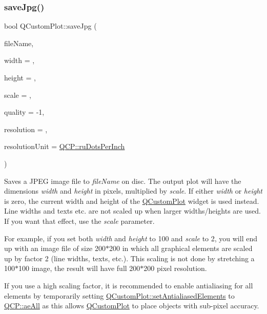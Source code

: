 \subsubsection{\texorpdfstring{saveJpg()}{saveJpg()}}
{\footnotesize\ttfamily bool Q\+Custom\+Plot\+::save\+Jpg (\begin{DoxyParamCaption}\item[{const Q\+String \&}]{file\+Name,  }\item[{int}]{width = {},  }\item[{int}]{height = {},  }\item[{double}]{scale = {},  }\item[{int}]{quality = {\ttfamily -\/1},  }\item[{int}]{resolution = {},  }\item[{\mbox{\hyperlink{namespace_q_c_p_a715d46153da230990aa887d0f0602452}{Q\+C\+P\+::\+Resolution\+Unit}}}]{resolution\+Unit = {\ttfamily \mbox{\hyperlink{namespace_q_c_p_a715d46153da230990aa887d0f0602452affb887d8efe79c39a1aca2acd7002afc}{Q\+C\+P\+::ru\+Dots\+Per\+Inch}}} }\end{DoxyParamCaption})}

Saves a J\+P\+EG image file to {\itshape file\+Name} on disc. The output plot will have the dimensions {\itshape width} and {\itshape height} in pixels, multiplied by {\itshape scale}. If either {\itshape width} or {\itshape height} is zero, the current width and height of the \mbox{\hyperlink{class_q_custom_plot}{Q\+Custom\+Plot}} widget is used instead. Line widths and texts etc. are not scaled up when larger widths/heights are used. If you want that effect, use the {\itshape scale} parameter.

For example, if you set both {\itshape width} and {\itshape height} to 100 and {\itshape scale} to 2, you will end up with an image file of size 200$\ast$200 in which all graphical elements are scaled up by factor 2 (line widths, texts, etc.). This scaling is not done by stretching a 100$\ast$100 image, the result will have full 200$\ast$200 pixel resolution.

If you use a high scaling factor, it is recommended to enable antialiasing for all elements by temporarily setting \mbox{\hyperlink{class_q_custom_plot_af6f91e5eab1be85f67c556e98c3745e8}{Q\+Custom\+Plot\+::set\+Antialiased\+Elements}} to \mbox{\hyperlink{namespace_q_c_p_ae55dbe315d41fe80f29ba88100843a0caa897c232a0ffc8368e7c100ffc59ef31}{Q\+C\+P\+::ae\+All}} as this allows \mbox{\hyperlink{class_q_custom_plot}{Q\+Custom\+Plot}} to place objects with sub-\/pixel accuracy.

